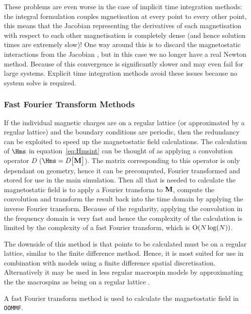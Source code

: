 These problems are even worse in the case of implicit time integration methods: the integral formulation couples mgnetisation at every point to every other point, this means that the Jacobian representing the derivatives of each magnetisation with respect to each other magnetisation is completely dense (and hence solution times are extremely slow)!
One way around this is to discard the magnetostatic interactions from the Jacobian \cite{DAquino2005}, but in this case we no longer have a real Newton method.
Because of this convergence is significantly slower and may even fail for large systems.
Explicit time integration methods avoid these issues because no system solve is required.


\subsubsection{Fast Fourier Transform Methods}

If the individual magnetic charges are on a regular lattice (or approximated by a regular lattice) and the boundary conditions are periodic, then the redundancy can be exploited to speed up the magnetostatic field calculations.
The calculation of $\Hms$ in equation~\eqref{eq:Hmsint} can be thought of as applying a convolution operator $D$ (\ie $\Hms = D \big[\Mv\big]$).
The matrix corresponding to this operator  is only dependant on geometry, hence it can be precomputed, Fourier transformed and stored for use in the main simulation.
Then all that is needed to calculate the magnetostatic field is to apply a Fourier transform to $\mathbf{M}$, compute the convolution and transform the result back into the time domain by applying the inverse Fourier transform.
Because of the regularity, applying the convolution in the frequency domain is very fast and hence the complexity of the calculation is limited by the complexity of a fast Fourier transform, which is $\text{O}(N \log(N))$.
\cite{Jones1997}

The downside of this method is that points to be calculated must be on a regular lattice, similar to the finite difference method.
Hence, it is most suited for use in combination with models using a finite difference spatial discretisation.
Alternatively it may be used in less regular macrospin models by approximating the the macrospins as being on a regular lattice \cite{Jones1997}.

A fast Fourier transform method is used to calculate the magnetostatic field in \texttt{OOMMF}.\cite{oommf-website}


